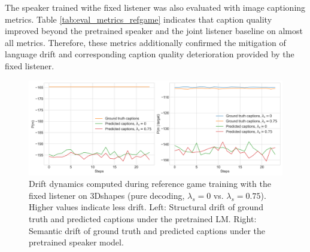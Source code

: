 The speaker trained withe fixed listener was also evaluated with image captioning metrics. Table \ref{tab:eval_metrics_refgame} indicates that caption quality improved beyond the pretrained speaker and the joint listener baseline on almost all metrics. Therefore, these metrics additionally confirmed the mitigation of language drift and corresponding caption quality deterioration provided by the fixed listener.

\begin{figure}[h]
	\centering
	\includegraphics[width=\linewidth]{images/3dshapes_fixedListener_structural_semantic_drift_49_pure_0_075_random.png}
	\caption{Drift dynamics computed during reference game training with the fixed listener on 3Dshapes (pure decoding, $\lambda_s=0$ vs. $\lambda_s=0.75$). Higher values indicate less drift. Left: Structural drift of ground truth and predicted captions under the pretrained LM. Right: Semantic drift of ground truth and predicted captions under the pretrained speaker model.}
	\label{fig:3dshapes_fixed_listener_0_075_str_sem_drift}
\end{figure}

